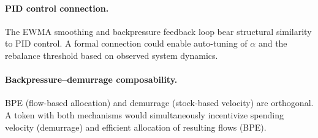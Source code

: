 \paragraph{PID control connection.}
The EWMA smoothing and backpressure feedback loop bear structural similarity
to PID control. A formal connection could enable auto-tuning of $\alpha$
and the rebalance threshold based on observed system dynamics.

\paragraph{Backpressure--demurrage composability.}
BPE (flow-based allocation) and demurrage (stock-based velocity) are orthogonal.
A token with both mechanisms would simultaneously incentivize spending velocity
(demurrage) and efficient allocation of resulting flows (BPE).
